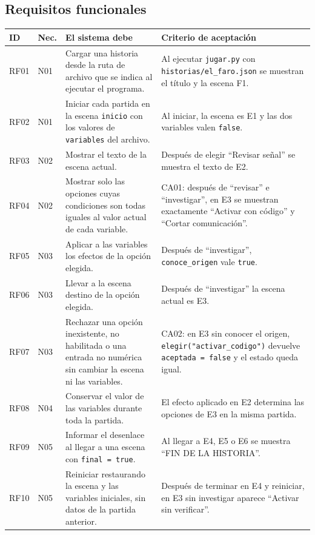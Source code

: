 \documentclass[11pt,letterpaper]{article}
\newcommand{\cod}[1]{\texttt{#1}}
\begin{document}
\subsection{Requisitos funcionales}
{\small
\begin{longtable}{@{}>{\raggedright}p{0.95cm}>{\raggedright}p{0.75cm}>{\raggedright}p{5.4cm}>{\raggedright\arraybackslash}p{8.1cm}@{}}
\toprule
ID & Nec. & El sistema debe & Criterio de aceptación\\ \midrule\endhead
RF01 & N01 & Cargar una historia desde la ruta de archivo que se indica al ejecutar el programa. & Al ejecutar \cod{jugar.py} con \cod{historias/el\_faro.json} se muestran el título y la escena F1.\\
RF02 & N01 & Iniciar cada partida en la escena \cod{inicio} con los valores de \cod{variables} del archivo. & Al iniciar, la escena es E1 y las dos variables valen \cod{false}.\\
RF03 & N02 & Mostrar el texto de la escena actual. & Después de elegir ``Revisar señal'' se muestra el texto de E2.\\
RF04 & N02 & Mostrar solo las opciones cuyas condiciones son todas iguales al valor actual de cada variable. & CA01: después de ``revisar'' e ``investigar'', en E3 se muestran exactamente ``Activar con código'' y ``Cortar comunicación''.\\
RF05 & N03 & Aplicar a las variables los efectos de la opción elegida. & Después de ``investigar'', \cod{conoce\_origen} vale \cod{true}.\\
RF06 & N03 & Llevar a la escena destino de la opción elegida. & Después de ``investigar'' la escena actual es E3.\\
RF07 & N03 & Rechazar una opción inexistente, no habilitada o una entrada no numérica sin cambiar la escena ni las variables. & CA02: en E3 sin conocer el origen, \cod{elegir("activar\_codigo")} devuelve \cod{aceptada = false} y el estado queda igual.\\
RF08 & N04 & Conservar el valor de las variables durante toda la partida. & El efecto aplicado en E2 determina las opciones de E3 en la misma partida.\\
RF09 & N05 & Informar el desenlace al llegar a una escena con \cod{final = true}. & Al llegar a E4, E5 o E6 se muestra ``FIN DE LA HISTORIA''.\\
RF10 & N05 & Reiniciar restaurando la escena y las variables iniciales, sin datos de la partida anterior. & Después de terminar en E4 y reiniciar, en E3 sin investigar aparece ``Activar sin verificar''.\\

\end{longtable}}
\end{document}
